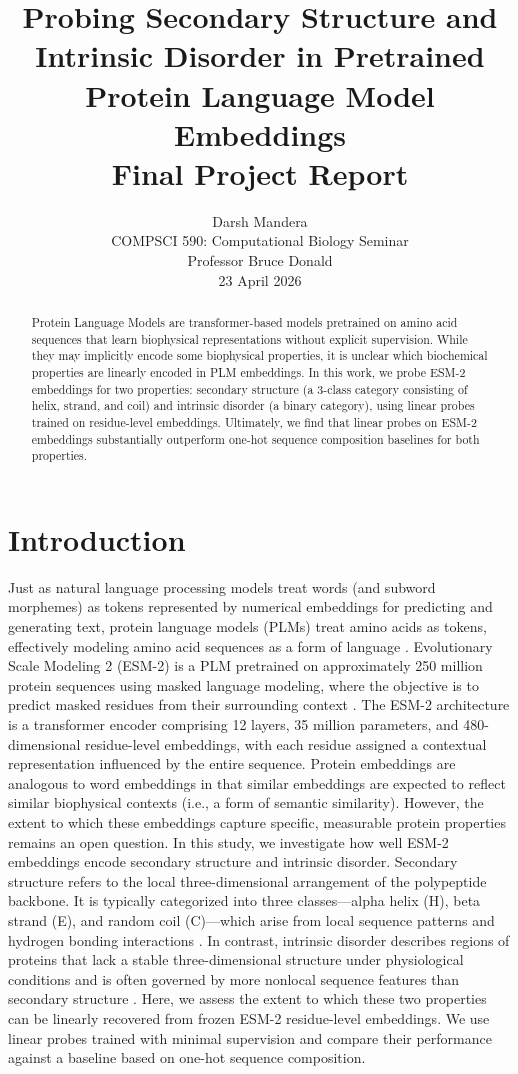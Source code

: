 \documentclass[12pt, letterpaper]{article}
\title{
    \vspace{2cm}
    \Large\textbf{Probing Secondary Structure and Intrinsic Disorder in Pretrained Protein Language Model Embeddings}\\
    \vspace{0.5cm}
    \large Final Project Report\\
}
\author{Darsh Mandera\\
        \small COMPSCI 590: Computational Biology Seminar\\
        \small Professor Bruce Donald \\
        \small 23 April 2026}
\date{}
\begin{document}
\maketitle
\thispagestyle{empty}
\newpage

\tableofcontents
\newpage

\begin{abstract}
Protein Language Models are transformer-based models pretrained on amino acid sequences that learn biophysical representations without explicit supervision. While they may implicitly encode some biophysical properties, it is unclear which biochemical properties are linearly encoded in PLM embeddings. In this work, we probe ESM-2 embeddings for two properties: secondary structure (a 3-class category consisting of helix, strand, and coil) and intrinsic disorder (a binary category), using linear probes trained on residue-level embeddings. Ultimately, we find that linear probes on ESM-2 embeddings substantially outperform one-hot sequence composition baselines for both properties.
\end{abstract}

\section{Introduction}
Just as natural language processing models treat words (and subword morphemes) as tokens represented by numerical embeddings for predicting and generating text, protein language models (PLMs) treat amino acids as tokens, effectively modeling amino acid sequences as a form of language \citet{chandra2023}. Evolutionary Scale Modeling 2 (ESM-2) is a PLM pretrained on approximately 250 million protein sequences using masked language modeling, where the objective is to predict masked residues from their surrounding context \citet{lin2023esm2}. The ESM-2 architecture is a transformer encoder comprising 12 layers, 35 million parameters, and 480-dimensional residue-level embeddings, with each residue assigned a contextual representation influenced by the entire sequence.
Protein embeddings are analogous to word embeddings in that similar embeddings are expected to reflect similar biophysical contexts (i.e., a form of semantic similarity). However, the extent to which these embeddings capture specific, measurable protein properties remains an open question. In this study, we investigate how well ESM-2 embeddings encode secondary structure and intrinsic disorder.
Secondary structure refers to the local three-dimensional arrangement of the polypeptide backbone. It is typically categorized into three classes—alpha helix (H), beta strand (E), and random coil (C)—which arise from local sequence patterns and hydrogen bonding interactions \citet{pauling1951}. In contrast, intrinsic disorder describes regions of proteins that lack a stable three-dimensional structure under physiological conditions and is often governed by more nonlocal sequence features than secondary structure \citet{habchi2014}.
Here, we assess the extent to which these two properties can be linearly recovered from frozen ESM-2 residue-level embeddings. We use linear probes trained with minimal supervision and compare their performance against a baseline based on one-hot sequence composition.
\end{document}
